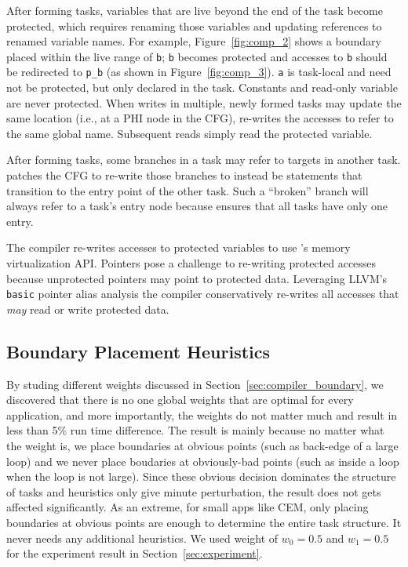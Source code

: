 After forming tasks, variables that are live beyond the end of the task become
protected, which requires renaming those variables and updating references to
renamed variable names.  
%
For example, Figure~\ref{fig:comp_2} shows a boundary placed within the live
range of {\tt b}; {\tt b} becomes protected and accesses to {\tt b} should be
redirected to {\tt p\_b} (as shown in Figure~\ref{fig:comp_3}).  {\tt a} is
task-local and need not be protected, but only declared in the task. Constants
and read-only variable are never protected.
%
When writes in multiple, newly formed tasks may update the same location (i.e.,
at a PHI node in the CFG), \sys re-writes the accesses to refer to the same global
name.   Subsequent reads simply read the protected variable. 

After forming tasks, some branches in a task may refer to targets in another
task. \sys patches the CFG to re-write those branches to instead be \transition
statements that transition to the entry point of the other task. Such a
``broken'' branch will always refer to a task's entry node because \sys ensures
that all tasks have only one entry. 

The compiler re-writes accesses to protected variables to use \sys's memory
virtualization API. Pointers pose a challenge to re-writing protected accesses
because unprotected pointers may point to protected data.  Leveraging LLVM's
{\tt basic} pointer alias analysis the compiler conservatively re-writes all
accesses that {\em may} read or write protected data. 

\subsection{Boundary Placement Heuristics}
\label{sec:compiler_heuristics}

By studing different weights discussed in Section~\ref{sec:compiler_boundary},
we discovered that there is no one global weights that are optimal for every
application, and more importantly, the weights do not matter much and
result in less than 5\% run time difference. The result is mainly because
no matter what the weight is, we place boundaries at obvious points (such as back-edge of a
large loop) and we never place boudaries at obviously-bad points (such as
inside a loop when the loop is not large). Since these obvious decision
dominates the structure of tasks and heuristics only give minute perturbation,
the result does not gets affected significantly.
As an extreme, for small apps like CEM, only placing boundaries at obvious points are enough to
determine the entire task structure. It never needs any additional heuristics.
We used weight of 
$w_{0} = 0.5$ and $w_{1} = 0.5$ for the experiment result in Section~\ref{sec:experiment}.



